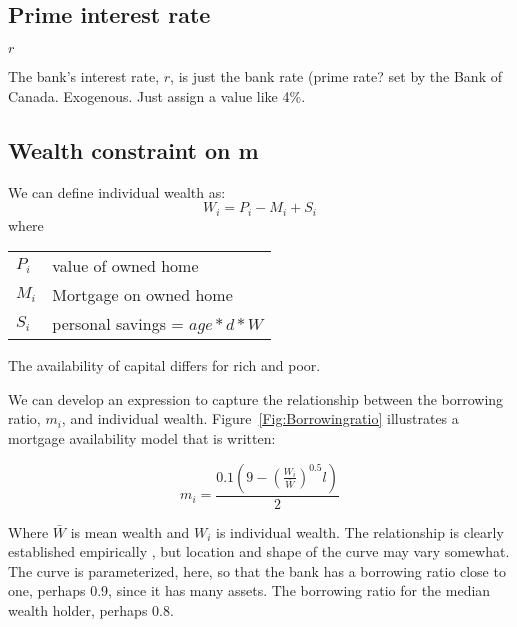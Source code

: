 \subsection{Prime interest rate}\label{SS:BankRate}
$r$

The bank's interest rate, $r$, is just the bank rate (prime rate? set by the Bank of Canada. Exogenous. Just assign  a value like 4\%.

\subsection{Wealth constraint on m} \label{SS:MWealthConstraint}

We can define individual wealth as:
\[W_i= P_i -M_i  +S_i\]
where 

\begin{tabular}{ll}
$P_i$ & value of owned home\\
$M_i$ & Mortgage on owned home\\
$S_i$ & personal savings = $age*d*W$\\
\end{tabular}

The availability of capital differs for rich and poor. 


We can develop an expression to capture the relationship between the \gls{borrowing ratio}, $m_i$,  and individual wealth. Figure~\ref{Fig:Borrowingratio} illustrates a mortgage availability  model that is written:

 \[ m_i = \frac{0.1 \left(9-\left(\frac{W_i}{\bar W}\right)^{0.5}l\right)}{2} \]

 
Where $\bar{W}$ is mean wealth and $W_i$ is individual wealth. 
The relationship is clearly established empirically \cite{}, but location and shape of the curve may vary somewhat. The curve is parameterized, here, so that the bank has a borrowing ratio close to one, perhaps 0.9, since it has many assets. The borrowing ratio for the median wealth holder, perhaps 0.8.



